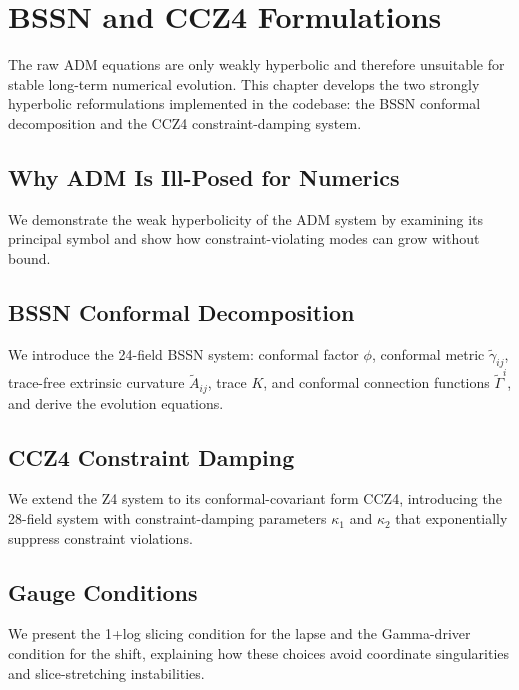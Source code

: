 \chapter{BSSN and CCZ4 Formulations}
\label{ch:bssn-ccz4}

The raw ADM equations are only weakly hyperbolic and therefore unsuitable for
stable long-term numerical evolution. This chapter develops the two strongly
hyperbolic reformulations implemented in the codebase: the BSSN conformal
decomposition and the CCZ4 constraint-damping system.

\section{Why ADM Is Ill-Posed for Numerics}
\label{sec:bssn-adm-illposed}

We demonstrate the weak hyperbolicity of the ADM system by examining its
principal symbol and show how constraint-violating modes can grow without bound.

\section{BSSN Conformal Decomposition}
\label{sec:bssn-conformal}

We introduce the 24-field BSSN system: conformal factor $\phi$, conformal metric
$\tilde\gamma_{ij}$, trace-free extrinsic curvature $\tilde A_{ij}$, trace $K$,
and conformal connection functions $\tilde\Gamma^i$, and derive the evolution
equations.

\section{CCZ4 Constraint Damping}
\label{sec:ccz4-damping}

We extend the Z4 system to its conformal-covariant form CCZ4, introducing the
28-field system with constraint-damping parameters $\kappa_1$ and $\kappa_2$
that exponentially suppress constraint violations.

\section{Gauge Conditions}
\label{sec:bssn-gauge}

We present the 1+log slicing condition for the lapse and the Gamma-driver
condition for the shift, explaining how these choices avoid coordinate
singularities and slice-stretching instabilities.

